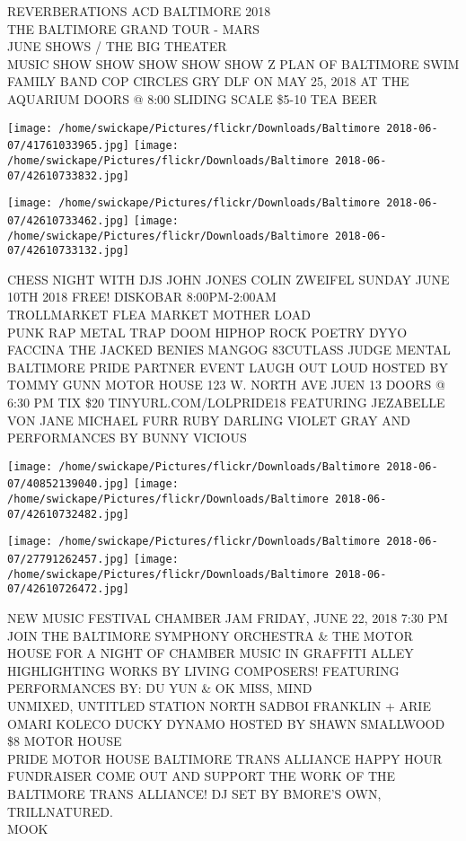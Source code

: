 \documentclass[10pt,letterpaper]{article}
\begin{document}
REVERBERATIONS ACD BALTIMORE 2018\\
THE BALTIMORE GRAND TOUR {-} MARS\\
JUNE SHOWS / THE BIG THEATER\\
MUSIC SHOW SHOW SHOW SHOW SHOW Z PLAN OF BALTIMORE SWIM FAMILY BAND COP CIRCLES GRY DLF ON MAY 25, 2018 AT THE AQUARIUM DOORS @ 8:00 SLIDING SCALE \$5{-}10 TEA BEER
\pagebreak

\texttt{[image: /home/swickape/Pictures/flickr/Downloads/Baltimore 2018-06-07/41761033965.jpg]}
\texttt{[image: /home/swickape/Pictures/flickr/Downloads/Baltimore 2018-06-07/42610733832.jpg]}

\texttt{[image: /home/swickape/Pictures/flickr/Downloads/Baltimore 2018-06-07/42610733462.jpg]}
\texttt{[image: /home/swickape/Pictures/flickr/Downloads/Baltimore 2018-06-07/42610733132.jpg]}

CHESS NIGHT WITH DJS JOHN JONES COLIN ZWEIFEL SUNDAY JUNE 10TH 2018 FREE!  DISKOBAR 8:00PM{-}2:00AM\\
TROLLMARKET FLEA MARKET MOTHER LOAD\\
PUNK RAP METAL TRAP DOOM HIPHOP ROCK POETRY DYYO FACCINA THE JACKED BENIES MANGOG 83CUTLASS JUDGE MENTAL\\
BALTIMORE PRIDE PARTNER EVENT LAUGH OUT LOUD HOSTED BY TOMMY GUNN MOTOR HOUSE 123 W. NORTH AVE JUEN 13 DOORS @ 6:30 PM TIX \$20 TINYURL.COM/LOLPRIDE18 FEATURING JEZABELLE VON JANE MICHAEL FURR RUBY DARLING VIOLET GRAY AND PERFORMANCES BY BUNNY VICIOUS
\pagebreak

\texttt{[image: /home/swickape/Pictures/flickr/Downloads/Baltimore 2018-06-07/40852139040.jpg]}
\texttt{[image: /home/swickape/Pictures/flickr/Downloads/Baltimore 2018-06-07/42610732482.jpg]}

\texttt{[image: /home/swickape/Pictures/flickr/Downloads/Baltimore 2018-06-07/27791262457.jpg]}
\texttt{[image: /home/swickape/Pictures/flickr/Downloads/Baltimore 2018-06-07/42610726472.jpg]}

NEW MUSIC FESTIVAL CHAMBER JAM FRIDAY, JUNE 22, 2018 7:30 PM JOIN THE BALTIMORE SYMPHONY ORCHESTRA \& THE MOTOR HOUSE FOR A NIGHT OF CHAMBER MUSIC IN GRAFFITI ALLEY HIGHLIGHTING WORKS BY LIVING COMPOSERS!  FEATURING PERFORMANCES BY: DU YUN \& OK MISS, MIND\\
UNMIXED, UNTITLED STATION NORTH SADBOI FRANKLIN + ARIE OMARI KOLECO DUCKY DYNAMO HOSTED BY SHAWN SMALLWOOD \$8 MOTOR HOUSE\\
PRIDE MOTOR HOUSE BALTIMORE TRANS ALLIANCE HAPPY HOUR FUNDRAISER COME OUT AND SUPPORT THE WORK OF THE BALTIMORE TRANS ALLIANCE!  DJ SET BY BMORE'S OWN, TRILLNATURED.\\
MOOK
\pagebreak
\end{document}
